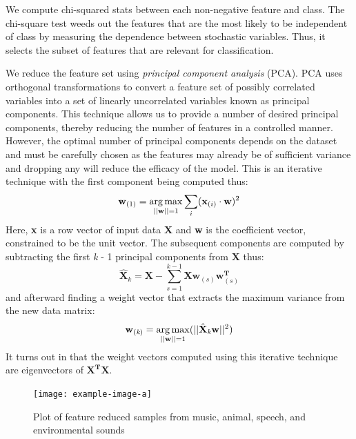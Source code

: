 %
We compute chi-squared stats between each non-negative feature and class.
% 
The chi-square test weeds out the features that are the most likely to be
independent of class by measuring the dependence between stochastic variables.
%
Thus, it selects the subset of features that are relevant for classification.

%
We reduce the feature set using \textit{principal component analysis} (PCA).
%
PCA uses orthogonal transformations to convert a feature set of 
possibly correlated variables into a set of linearly uncorrelated variables
known as principal components. 
%
This technique allows us to provide a number of desired principal components,
thereby reducing the number of features in a controlled manner. 
%
However, the optimal number of principal components depends on the dataset 
and must be carefully chosen as the features may already be of sufficient
variance and dropping any will reduce the efficacy of the model. 
%
This is an iterative technique with the first component being computed thus:
\begin{equation}
    \textbf{w}_{(1)} = \operatorname*{arg\,max}_{||\textbf{w}||=1}{\sum_{i}(\textbf{x}_{(i)} \cdot \textbf{w})^2}
\end{equation}
%
Here, \textbf{x} is a row vector of input data \textbf{X} and \textbf{w} is 
the coefficient vector, constrained to be the unit vector. 
%
The subsequent components are computed by subtracting the first \textit{k} - 1
principal components from \textbf{X} thus:
\begin{equation}
    \hat{\textbf{X}}_k = \textbf{X} - \sum_{s=1}^{k-1}{\textbf{X}\textbf{w}_{(s)}\textbf{w}_{(s)}^\textbf{T}}
\end{equation}
%
and afterward finding a weight vector that extracts the maximum variance from
the new data matrix:
\begin{equation}
    \textbf{w}_{(\textit{k})} = \operatorname*{arg\,max}_{||\textbf{w}||=1}(||\hat{\textbf{X}}_{\textit{k}}\textbf{w}||^2)
\end{equation}
%
It turns out in that the weight vectors computed using this iterative technique
are eigenvectors of $ \textbf{X}^\textbf{T}\textbf{X} $.
%

\begin{figure}[t]
    \centering
    \texttt{[image: example-image-a]}
    \caption{Plot of feature reduced samples from music, animal, speech, and environmental sounds}
    \label{fig:top-dist}
\end{figure}

